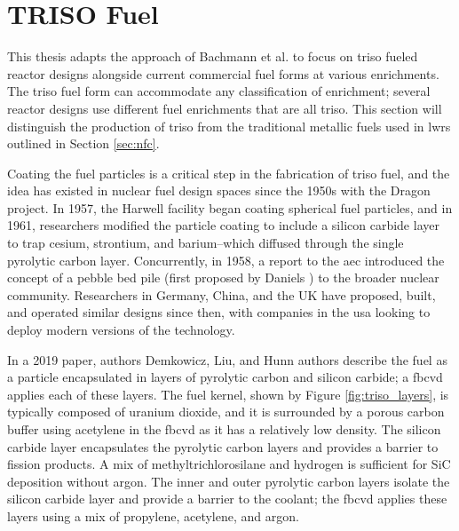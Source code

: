 \section{TRISO Fuel}
\label{sec:triso_fuel}

This thesis adapts the approach of Bachmann et al.
\cite{bachmann_enrichment_2021} to focus on \gls{triso} fueled reactor designs
alongside current commercial fuel forms at various enrichments. The \gls{triso} fuel form can accommodate any classification of enrichment; several reactor designs use different fuel enrichments that are all \gls{triso}. This section will distinguish the production of \gls{triso} from the traditional metallic fuels used in \glspl{lwr} outlined in Section \ref{sec:nfc}.

Coating the fuel particles is a critical step in the fabrication of \gls{triso}
fuel, and the idea has existed in nuclear fuel design spaces since the 1950s
\cite{price_dragon_2012} with the Dragon project. In 1957, the Harwell facility
began coating spherical fuel particles, and in 1961, researchers modified the
particle coating to include a silicon carbide layer to trap cesium, strontium,
and barium--which diffused through the single pyrolytic carbon layer.
Concurrently, in 1958, a report to the \gls{aec} introduced the concept of a
pebble bed pile (first proposed by Daniels
\cite{f_b_daniels_suggestions_1944}) to the broader nuclear community.
Researchers in Germany, China, and the UK have proposed, built, and operated
similar designs since then, with companies in the \gls{usa} looking to deploy
modern versions of the technology.

In a 2019 paper, authors Demkowicz, Liu, and Hunn \cite{particle_review_2019}
authors describe the fuel as a particle encapsulated in layers of pyrolytic
carbon and silicon carbide; a \gls{fbcvd} applies each of these layers. The
fuel kernel, shown by Figure \ref{fig:triso_layers}, is typically composed of
uranium dioxide, and it is surrounded by a porous carbon buffer using acetylene
in the \gls{fbcvd} as it has a relatively low density. The silicon carbide
layer encapsulates the pyrolytic carbon layers and provides a barrier to
fission products. A mix of methyltrichlorosilane and hydrogen is sufficient for
SiC deposition without argon. The inner and outer pyrolytic carbon layers
isolate the silicon carbide layer and provide a barrier to the coolant; the
\gls{fbcvd} applies these layers using a mix of propylene, acetylene, and argon.


